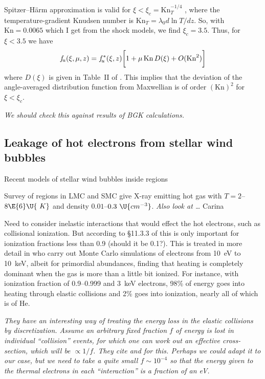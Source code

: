 \documentclass{emulateapj}
\newcommand\Kn{\ensuremath{\mathrm{Kn}}}
\newcommand\pcc{\U{cm^{-3}}}
\newcommand\hii{\ion{H}{2}}
\begin{document}
Spitzer--Härm approximation is valid for \(\xi < \xi_c =
\Kn_{T}^{-1/4}\) \citep{Shoub:1983a}, where the temperature-gradient Knudsen number is
\(\Kn_T = \lambda_0 d\ln T/ d z\). So, with \(\Kn = 0.0065\) which I
get from the shock models, we find \(\xi_c = 3.5\). Thus, for \(\xi <
3.5\) we have 
\begin{equation}
  \label{eq:7}
  \fu(\xi, \mu, z) = \fu^*(\xi, z) \biggl[ 
  1 + \mu\, \Kn\, D(\xi) + O(\Kn^2)
  \biggr]
\end{equation}
where \(D(\xi)\) is given in Table~II of \citet{Spitzer:1953a}.  This
implies that the deviation of the angle-averaged distribution function
from  Maxwellian is of order \((\Kn)^2\) for \(\xi < \xi_c\).

\textit{We should check this against results of BGK calculations. }


\subsection{Leakage of hot electrons from stellar wind bubbles}
\label{sec:diff-hot-electr}

Recent models of stellar wind bubbles inside \hii{} regions \citep{Mackey:2015a}

Survey of \hii{} regions in LMC and SMC \citep{Lopez:2014a} give X-ray
emitting hot gas with \(T = 2\)--\(8\E{6}\U{\ K}\) and density
\(0.01\)--\(0.3\ \pcc\). \textit{Also look at \dots } Carina \citep{Townsley:2011b}

Need to consider inelastic interactions that would effect the hot
electrons, such as collisional ionization.  But according to \S11.3.3
of \citet{2006agna.book.....O} this is only important for ionization
fractions less than 0.9 (should it be 0.1?).  This is treated in more detail in
\citet{Furlanetto:2010a} who carry out Monte Carlo simulations of
electrons from 10~eV to 10~keV, albeit for primordial abundances,
finding that heating is completely dominant when the gas is more than
a little bit ionized.  For instance, with ionization fraction of
0.9--0.999 and 3~keV electrons, 98\% of energy goes into heating
through elastic collisions and 2\% goes into ionization, nearly all of
which is of He.  

\textit{They have an interesting way of treating the energy loss in
  the elastic collisions by discretization.  Assume an arbitrary fixed
  fraction \(f\)
  of energy is lost in individual ``collision'' events, for which one
  can work out an effective cross-section, which will be
  \(\propto 1/f\).
  They cite \citet{Habing:1979a} and \citet{Shull:1979a} for this.
  Perhaps we could adapt it to our case, but we need to take a quite
  small \(f \sim 10^{-4}\)
  so that the energy given to the thermal electrons in each
  ``interaction'' is a fraction of an eV. }
\end{document}
